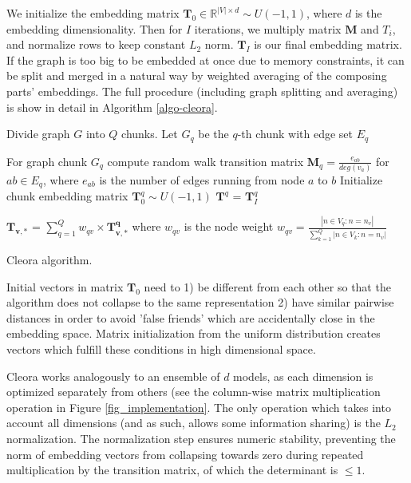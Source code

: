 \documentclass{IEEEtran}
\begin{document}
We initialize the embedding matrix $\mathbf{T}_0 \in \mathbb{R}^{|V| \times d} \sim U\left(-1, 1\right)$, where $d$ is the embedding dimensionality. Then for $I$ iterations, we multiply matrix $\mathbf{M}$ and $T_i$, and normalize rows to keep constant $L_2$ norm. $\mathbf{T}_I$ is our final embedding matrix. If the graph is too big to be embedded at once due to memory constraints, it can be split and merged in a natural way by weighted averaging of the composing parts' embeddings. The full procedure (including graph splitting and averaging) is show in detail in Algorithm \ref{algo-cleora}.

\begin{algorithm}[]
Divide graph $G$ into $Q$ chunks. Let $G_{q}$ be the $q$-th chunk with edge set $E_{q}$\;

 {
 For graph chunk $G_{q}$ compute random walk transition matrix $\mathbf{M}_{q}=\frac{e_{a b}}{deg(v_{a})}$ for $a b \in E_{q}$, where $e_{ab}$ is the number of edges running from node $a$ to $b$  \;
 Initialize chunk embedding matrix $\mathbf{T}^{q}_{0} \sim U\left(-1, 1\right)$ \;
 $\mathbf{T}^{q}$ = $\mathbf{T}^{q}_{I}$\;
 }
 
  {
    $\mathbf{T_{v,*}}$ = $\sum_{q=1}^{Q}{w_{qv} \times \mathbf{T^{q}_{v,*}}}$ where $w_{qv}$ is the node weight $w_{qv} = \frac{|n \in V_{q}: n = n_{v} |}{\sum_{k=1}^{Q}{|n \in V_{k}: n = n_{v} |}}$
 }
 \caption{Cleora algorithm.}
 \label{algo-cleora}
\end{algorithm}



Initial vectors in matrix $\mathbf{T}_0$ need to 1) be different from each other so that the algorithm does not collapse to the same representation 2) have similar pairwise distances in order to avoid 'false friends' which are accidentally close in the embedding space. Matrix initialization from the uniform distribution creates vectors which fulfill these conditions in high dimensional space.

Cleora works analogously to an ensemble of $d$ models, as each dimension is optimized separately from others (see the column-wise matrix multiplication operation in Figure \ref{fig_implementation}. The only operation which takes into account all dimensions (and as such, allows some information sharing) is the $L_2$ normalization. The normalization step ensures numeric stability, preventing the norm of embedding vectors from collapsing towards zero during repeated multiplication by the transition matrix, of which the determinant is $\leq{1}$.
\end{document}
